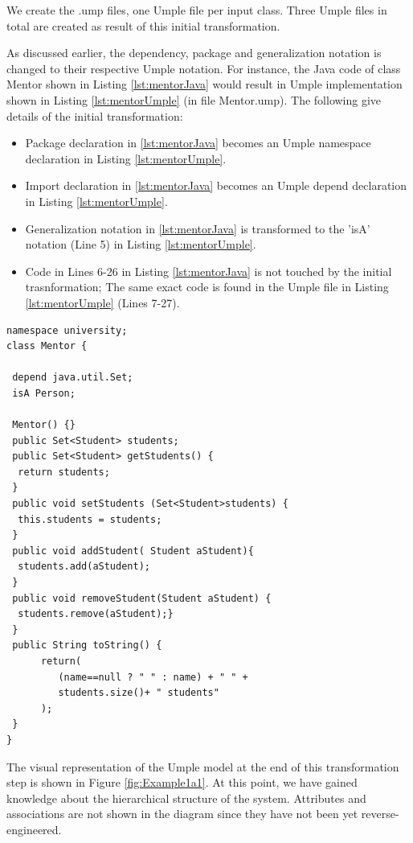 We create the .ump files, one Umple file per input class. Three Umple files in total are created as result of this initial transformation.

As discussed earlier, the dependency, package and generalization notation is changed to their respective Umple notation. For instance, the Java code of class Mentor shown in Listing \ref{lst:mentorJava} would result in  Umple implementation shown in Listing  \ref{lst:mentorUmple} (in file Mentor.ump). The following give details of the initial transformation:

\begin{itemize}
\item Package declaration in \ref{lst:mentorJava} becomes an Umple namespace declaration in Listing \ref{lst:mentorUmple}.
\item Import declaration in \ref{lst:mentorJava} becomes an Umple depend declaration in Listing \ref{lst:mentorUmple}.
\item Generalization notation in \ref{lst:mentorJava} is transformed to the 'isA' notation (Line 5) in Listing \ref{lst:mentorUmple}.
\item Code in Lines 6-26 in Listing \ref{lst:mentorJava} is not touched by the initial trasnformation; The same exact code is found in the Umple file in Listing \ref{lst:mentorUmple} (Lines 7-27).
\end{itemize}

\begin{lstlisting}[style=UmpleIn,caption=Mentor.ump,label=lst:mentorUmple]
namespace university;
class Mentor { 

 depend java.util.Set;
 isA Person;
 
 Mentor() {}
 public Set<Student> students;
 public Set<Student> getStudents() {
  return students; 
 } 
 public void setStudents (Set<Student>students) { 
  this.students = students;
 } 
 public void addStudent( Student aStudent){
  students.add(aStudent); 
 }
 public void removeStudent(Student aStudent) {
  students.remove(aStudent);} 
 } 
 public String toString() {
      return(
         (name==null ? " " : name) + " " +
         students.size()+ " students"
      );
 }
}
\end{lstlisting}

The visual representation of the Umple model at the end of this transformation step is shown in Figure \ref{fig:Example1a1}. At this point, we have gained knowledge about the hierarchical structure of the system. Attributes and associations are not shown in the diagram since they have not been yet reverse-engineered.

